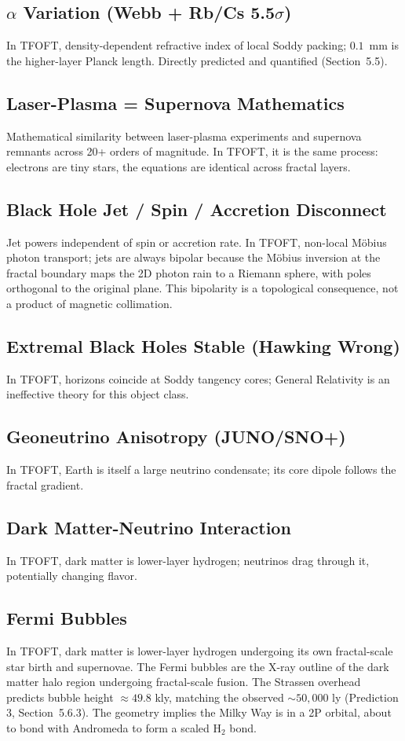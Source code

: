 \documentclass[11pt,a4paper]{article}
\begin{document}
\subsection{$\alpha$ Variation (Webb + Rb/Cs 5.5$\sigma$)}
In TFOFT, density-dependent refractive index of local Soddy packing; $0.1$~mm is the
higher-layer Planck length. Directly predicted and quantified (Section~5.5).

\subsection{Laser-Plasma = Supernova Mathematics}
Mathematical similarity between laser-plasma experiments and supernova remnants across
20+ orders of magnitude. In TFOFT, it is the same process: electrons are tiny stars,
the equations are identical across fractal layers.

\subsection{Black Hole Jet / Spin / Accretion Disconnect}
Jet powers independent of spin or accretion rate. In TFOFT, non-local M\"obius photon
transport; jets are always bipolar because the M\"obius inversion at the fractal
boundary maps the 2D photon rain to a Riemann sphere, with poles orthogonal to the
original plane. This bipolarity is a topological consequence, not a product of
magnetic collimation.

\subsection{Extremal Black Holes Stable (Hawking Wrong)}
In TFOFT, horizons coincide at Soddy tangency cores; General Relativity is an
ineffective theory for this object class.

\subsection{Geoneutrino Anisotropy (JUNO/SNO+)}
In TFOFT, Earth is itself a large neutrino condensate; its core dipole follows the
fractal gradient.

\subsection{Dark Matter-Neutrino Interaction}
In TFOFT, dark matter is lower-layer hydrogen; neutrinos drag through it, potentially
changing flavor.

\subsection{Fermi Bubbles}
In TFOFT, dark matter is lower-layer hydrogen undergoing its own fractal-scale star
birth and supernovae. The Fermi bubbles are the X-ray outline of the dark matter halo
region undergoing fractal-scale fusion. The Strassen overhead predicts bubble height
$\approx49.8$ kly, matching the observed $\sim50{,}000$ ly (Prediction 3,
Section~5.6.3). The geometry implies the Milky Way is in a 2P orbital, about to bond
with Andromeda to form a scaled H$_2$ bond.
\end{document}
